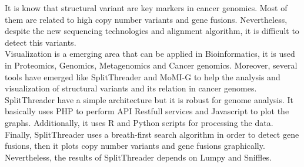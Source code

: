 \documentclass{svproc}
\begin{document}
It is know that structural variant are key markers in cancer genomics. Most of them are related to high copy number variants and gene fusions. Nevertheless, despite the new sequencing technologies and alignment algorithm, it is difficult to detect this variants. \\

Visualization is a emerging area that can be applied in Bioinformatics, it is used in Proteomics, Genomics, Metagenomics and Cancer genomics. Moreover, several tools have emerged like SplitThreader and MoMI-G to help the analysis and visualization of structural variants and its relation in cancer genomes.\\

SplitThreader have a simple architecture but it is robust for genome analysis. It basically uses PHP to perform API Restfull services and Javascript to plot the graphs. Additionally, it uses R and Python scripts for processing the data.\\

Finally, SplitThreader uses a breath-first search algorithm in order to detect gene fusions, then it plots copy number variants and gene fusions graphically. Nevertheless, the results of SplitThreader depends on  Lumpy and Sniffles.   



\end{document}

